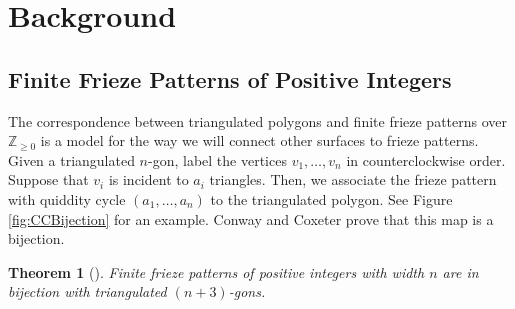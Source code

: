\documentclass[12pt]{article}
\newtheorem{theorem}{Theorem}
\theoremstyle{remark}
\begin{document}
\section{Background}

\subsection{Finite Frieze Patterns of Positive Integers}\label{subsec:ConwayCoxeter}

The correspondence between triangulated polygons and finite frieze patterns over $\mathbb{Z}_{\geq 0}$ is a model for the way we will connect other surfaces to frieze patterns.
Given a triangulated $n$-gon, label the vertices $v_1,\ldots,v_n$ in counterclockwise order. Suppose that $v_i$ is incident to $a_i$ triangles. Then, we associate the frieze pattern with quiddity cycle $(a_1,\ldots,a_n)$ to the triangulated polygon. See Figure \ref{fig:CCBijection} for an example. Conway and Coxeter prove that this map is a bijection. 

\begin{theorem}[\cite{10}]
Finite frieze patterns of positive integers with width $n$ are in bijection with triangulated $(n+3)$-gons. 
\end{theorem}
\end{document}
